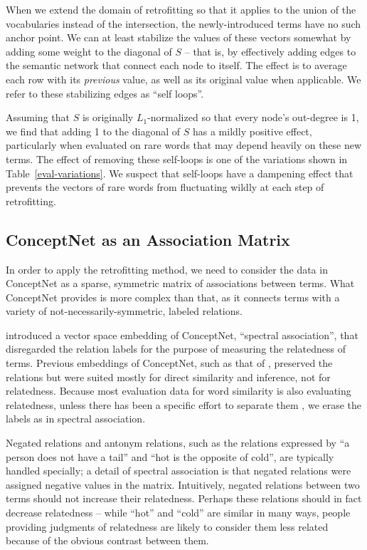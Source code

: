 \documentclass[letterpaper]{article}
\begin{document}
When we extend the domain of retrofitting so that it applies to the union of
the vocabularies instead of the intersection, the newly-introduced terms have
no such anchor point. We can at least stabilize the values of these vectors
somewhat by adding some weight to the diagonal of $S$ -- that is, by
effectively adding edges to the semantic network that connect each node to
itself. The effect is to average each row with its {\em previous} value, as
well as its original value when applicable. We refer to these stabilizing edges
as ``self loops''.

Assuming that $S$ is originally $L_1$-normalized so that every node's
out-degree is 1, we find that adding 1 to the diagonal of $S$ has a mildly
positive effect, particularly when evaluated on rare words that may depend
heavily on these new terms. The effect of removing these self-loops is one of
the variations shown in Table~\ref{eval-variations}.  We suspect that
self-loops have a dampening effect that prevents the vectors of rare words from
fluctuating wildly at each step of retrofitting.

\subsection{ConceptNet as an Association Matrix}

In order to apply the retrofitting method, we need to consider the data in
ConceptNet as a sparse, symmetric matrix of associations between terms. What
ConceptNet provides is more complex than that, as it connects terms with a
variety of not-necessarily-symmetric, labeled relations.

 introduced a vector space embedding of ConceptNet,
``spectral association'', that disregarded the relation labels for the purpose
of measuring the relatedness of terms. Previous embeddings of ConceptNet, such
as that of , preserved the relations but were
suited mostly for direct similarity and inference, not for relatedness. Because
most evaluation data for word similarity is also evaluating relatedness, unless
there has been a specific effort to separate them \cite{agirre2009similarity},
we erase the labels as in spectral association.

Negated relations and antonym relations, such as the relations expressed by
``a person does not have a tail'' and ``hot is the opposite of cold'', are
typically handled specially; a detail of spectral association is that negated
relations were assigned negative values in the matrix. Intuitively, negated
relations between two terms should not increase their relatedness. Perhaps
these relations should in fact decrease relatedness -- while ``hot'' and
``cold'' are similar in many ways, people providing judgments of relatedness
are likely to consider them less related because of the obvious contrast
between them.
\end{document}
